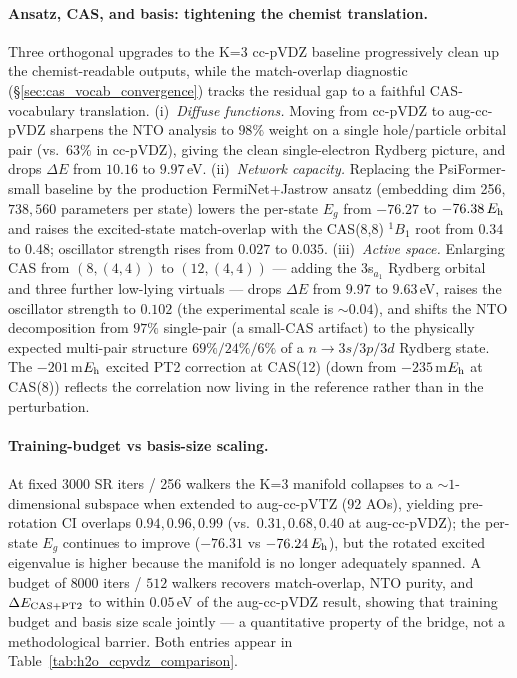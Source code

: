 \documentclass[journal=jctcce,manuscript=suppinfo,layout=traditional]{achemso}
\begin{document}
\paragraph{Ansatz, CAS, and basis: tightening the chemist translation.}
Three orthogonal upgrades to the K=3 cc-pVDZ baseline progressively
clean up the chemist-readable outputs, while the
match-overlap diagnostic (\S\ref{sec:cas_vocab_convergence})
tracks the residual gap to a faithful CAS-vocabulary translation.
(i)~\emph{Diffuse functions.} Moving from cc-pVDZ to aug-cc-pVDZ
sharpens the NTO analysis to $98\%$ weight on a single hole/particle
orbital pair (vs.\ $63\%$ in cc-pVDZ), giving the clean
single-electron Rydberg picture, and drops $\Delta E$ from
$10.16$ to $9.97$\,eV. (ii)~\emph{Network capacity.} Replacing the
PsiFormer-small baseline by the production FermiNet+Jastrow
ansatz (embedding dim 256, $738{,}560$ parameters per state) lowers
the per-state $E_g$ from $-76.27$ to $-76.38\,E_{\rm h}$ and raises
the excited-state match-overlap with the CAS(8,8) $^1B_1$ root from
$0.34$ to $0.48$; oscillator strength rises from $0.027$ to $0.035$.
(iii)~\emph{Active space.} Enlarging CAS from $(8,(4,4))$ to
$(12,(4,4))$ --- adding the 3s$_{a_1}$ Rydberg orbital and three
further low-lying virtuals --- drops $\Delta E$ from $9.97$ to
$9.63$\,eV, raises the oscillator strength to $0.102$ (the
experimental scale is $\sim 0.04$), and shifts the NTO decomposition
from $97\%$ single-pair (a small-CAS artifact) to the physically
expected multi-pair structure $69\%/24\%/6\%$ of a $n\to 3s/3p/3d$
Rydberg state. The $-201$\,m$E_{\rm h}$ excited PT2 correction at
CAS(12) (down from $-235$\,m$E_{\rm h}$ at CAS(8)) reflects the
correlation now living in the reference rather than in the
perturbation.

\paragraph{Training-budget vs basis-size scaling.}
At fixed 3000 SR iters / 256 walkers the K=3 manifold collapses to a
$\sim 1$-dimensional subspace when extended to aug-cc-pVTZ (92 AOs),
yielding pre-rotation CI overlaps $0.94, 0.96, 0.99$ (vs.\
$0.31, 0.68, 0.40$ at aug-cc-pVDZ); the per-state $E_g$ continues to
improve ($-76.31$ vs $-76.24\,E_{\rm h}$), but the rotated excited
eigenvalue is higher because the manifold is no longer adequately
spanned. A budget of $8000$ iters / $512$ walkers recovers
match-overlap, NTO purity, and $\Delta E_{\rm CAS+PT2}$ to within
$0.05$\,eV of the aug-cc-pVDZ result, showing that training budget
and basis size scale jointly --- a quantitative property of the
bridge, not a methodological barrier. Both entries appear in
Table~\ref{tab:h2o_ccpvdz_comparison}.
\end{document}
